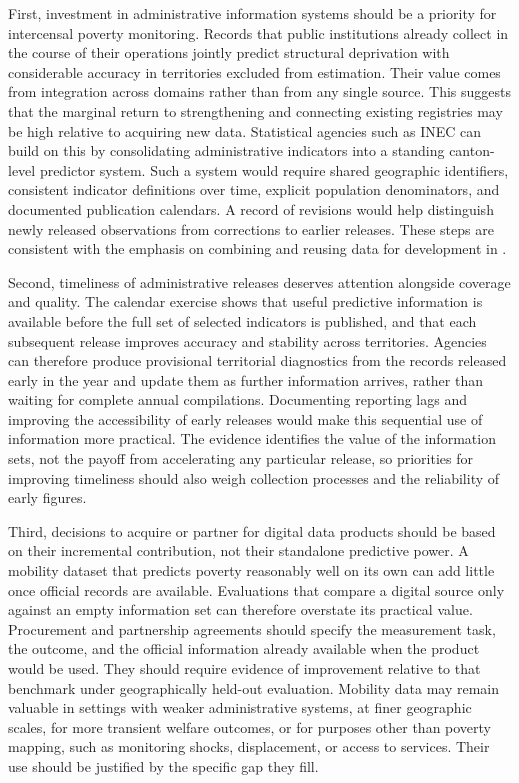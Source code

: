 \documentclass[pdflatex,sn-apa]{sn-jnl}
\begin{document}
First, investment in administrative information systems should be a priority for intercensal poverty monitoring. Records that public institutions already collect in the course of their operations jointly predict structural deprivation with considerable accuracy in territories excluded from estimation. Their value comes from integration across domains rather than from any single source. This suggests that the marginal return to strengthening and connecting existing registries may be high relative to acquiring new data. Statistical agencies such as INEC can build on this by consolidating administrative indicators into a standing canton-level predictor system. Such a system would require shared geographic identifiers, consistent indicator definitions over time, explicit population denominators, and documented publication calendars. A record of revisions would help distinguish newly released observations from corrections to earlier releases. These steps are consistent with the emphasis on combining and reusing data for development in \citet{WorldBank2021Data}.

Second, timeliness of administrative releases deserves attention alongside coverage and quality. The calendar exercise shows that useful predictive information is available before the full set of selected indicators is published, and that each subsequent release improves accuracy and stability across territories. Agencies can therefore produce provisional territorial diagnostics from the records released early in the year and update them as further information arrives, rather than waiting for complete annual compilations. Documenting reporting lags and improving the accessibility of early releases would make this sequential use of information more practical. The evidence identifies the value of the information sets, not the payoff from accelerating any particular release, so priorities for improving timeliness should also weigh collection processes and the reliability of early figures.

Third, decisions to acquire or partner for digital data products should be based on their incremental contribution, not their standalone predictive power. A mobility dataset that predicts poverty reasonably well on its own can add little once official records are available. Evaluations that compare a digital source only against an empty information set can therefore overstate its practical value. Procurement and partnership agreements should specify the measurement task, the outcome, and the official information already available when the product would be used. They should require evidence of improvement relative to that benchmark under geographically held-out evaluation. Mobility data may remain valuable in settings with weaker administrative systems, at finer geographic scales, for more transient welfare outcomes, or for purposes other than poverty mapping, such as monitoring shocks, displacement, or access to services. Their use should be justified by the specific gap they fill.
\end{document}

